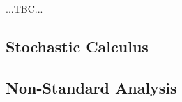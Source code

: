 

...TBC...


% 


\subsection{Stochastic Calculus}


\subsection{Non-Standard Analysis}






\begin{comment}

Every Unsolved Problem in Calculus
https://www.youtube.com/watch?v=An71KvzRd2c
-Casas-Alvera conjecture, Riemann conjecture, Navier-Stokes existence and smoothness, Jacobian 
 conjecture


\end{comment}